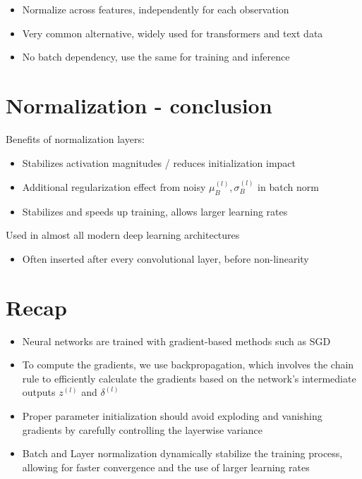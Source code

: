 \documentclass[10pt]{article}
\begin{document}
\begin{itemize}
  \item Normalize across features, independently for each observation
  \item Very common alternative, widely used for transformers and text data
  \item No batch dependency, use the same for training and inference
\end{itemize}

\section*{Normalization - conclusion}
Benefits of normalization layers:

\begin{itemize}
  \item Stabilizes activation magnitudes / reduces initialization impact
  \item Additional regularization effect from noisy $\mu_{B}^{(l)}, \sigma_{B}^{(l)}$ in batch norm
  \item Stabilizes and speeds up training, allows larger learning rates
\end{itemize}

Used in almost all modern deep learning architectures

\begin{itemize}
  \item Often inserted after every convolutional layer, before non-linearity
\end{itemize}

\section*{Recap}
\begin{itemize}
  \item Neural networks are trained with gradient-based methods such as SGD

  \item To compute the gradients, we use backpropagation, which involves the chain rule to efficiently calculate the gradients based on the network's intermediate outputs $z^{(l)}$ and $\delta^{(l)}$

  \item Proper parameter initialization should avoid exploding and vanishing gradients by carefully controlling the layerwise variance

  \item Batch and Layer normalization dynamically stabilize the training process, allowing for faster convergence and the use of larger learning rates

\end{itemize}
\end{document}
